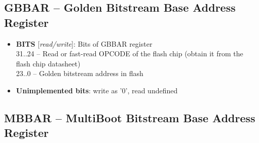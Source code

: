 \subsection{GBBAR -- Golden Bitstream Base Address Register}
\label{app:memmap-gbbar}

\vspace{11pt}
\noindent
{}

\begin{itemize}
\item \begin{small}
{\bf 
BITS
} [\emph{read/write}]: Bits of GBBAR register
\\
31..24 -- Read or fast-read OPCODE of the flash chip (obtain it from the flash chip datasheet) \\                     23..0  -- Golden bitstream address in flash
\end{small}
\item \begin{small}
\textbf{Unimplemented bits}: write as '0', read undefined
\end{small}
\end{itemize}
\vspace{11pt}
\subsection{MBBAR -- MultiBoot Bitstream Base Address Register}
\label{app:memmap-mbbar}

